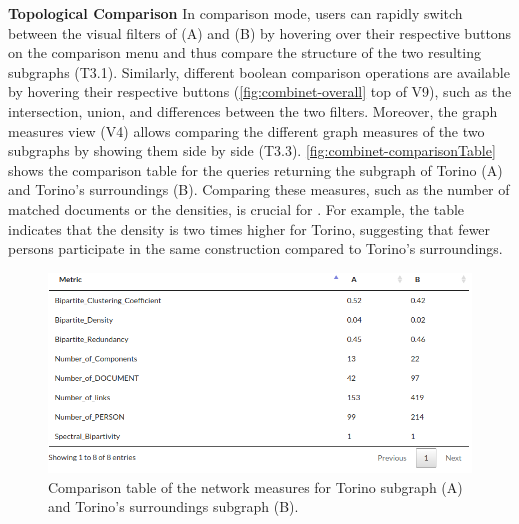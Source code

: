 \noindent\textbf{Topological Comparison}
In comparison mode,
users can rapidly switch between the visual filters of (A) and (B) by hovering over their respective buttons on the comparison menu and thus compare the structure of the two resulting subgraphs (T3.1).
Similarly, different boolean comparison operations are available by hovering their respective buttons (\autoref{fig:combinet-overall} top of V9), such as the intersection, union, and differences between the two filters. %
Moreover, the graph measures view (V4) allows comparing the different graph measures of the two subgraphs by showing them side by side (T3.3).
\autoref{fig:combinet-comparisonTable} shows the comparison table for the queries returning the subgraph of Torino (A) and Torino's surroundings (B).
Comparing these measures, such as the number of matched documents or the densities, is crucial for \sna.
For example, the table indicates that the density is two times higher for Torino, suggesting that fewer persons participate in the same construction compared to Torino's surroundings.

\begin{figure}[!ht]
    \centering
    \includegraphics[width=0.8\linewidth]{static/figures/ComBiNet/graph_measures_Torino_territoireandpiemont}
  \caption{Comparison table of the network measures for Torino subgraph (A) and Torino's surroundings subgraph (B).}\label{fig:combinet-comparisonTable}
\end{figure}


